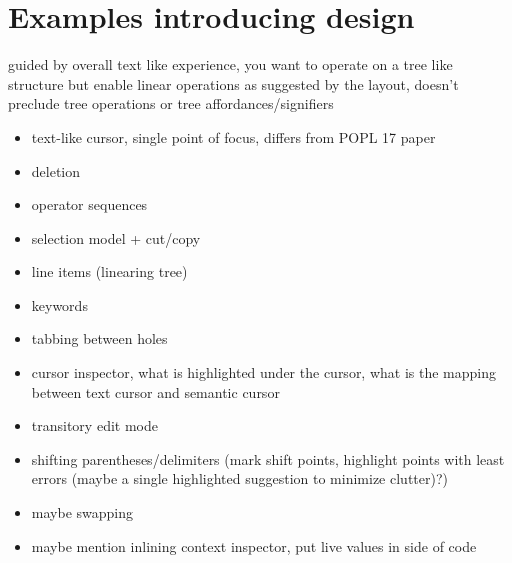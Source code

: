 \documentclass[runningheads]{llncs}
\begin{document}
\section{Examples introducing design}
guided by overall text like experience, you want to operate on a tree like structure but enable linear operations as suggested by the layout, doesn't preclude tree operations or tree affordances/signifiers
\begin{itemize}
\item text-like cursor, single point of focus, differs from POPL 17 paper
\item deletion
\item operator sequences
\item selection model + cut/copy
\item line items (linearing tree)
\item keywords
\item tabbing between holes
\item cursor inspector, what is highlighted under the cursor, what is the mapping between text cursor and semantic cursor
\item transitory edit mode
\item shifting parentheses/delimiters (mark shift points, highlight points with least errors (maybe a single highlighted suggestion to minimize clutter)?)
\item maybe swapping
\item maybe mention inlining context inspector, put live values in side of code
\end{itemize}
\end{document}
